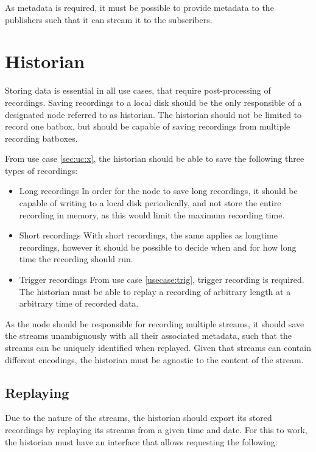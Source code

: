 
As metadata is required, it must be possible to provide metadata to the publishers such that it can stream it to the subscribers. 


\section{Historian}

Storing data is essential in all use cases, that require post-processing of recordings. Saving recordings to a local disk should be the only responsible of a designated node referred to as historian.
The historian should not be limited to record one batbox, but should be capable of saving recordings from multiple recording batboxes.

From use case \ref{sec:uc:x}, the historian should be able to save the following three types of recordings:
\begin{itemize}
	\item Long recordings
		In order for the node to save long recordings, it should be capable of writing to a local disk periodically, and not store the entire recording in memory, as this would limit the maximum recording time.

	\item Short recordings
		With short recordings, the same applies as longtime recordings, however it should be possible to decide when and for how long time the recording should run.
	\item Trigger recordings
		From use case \ref{usecase:trig}, trigger recording is required. The historian must be able to replay a recording of arbitrary length at a arbitrary time of recorded data.
\end{itemize}

As the node should be responsible for recording multiple streams, it should save the streams unambiguously with all their associated metadata, such that the streams can be uniquely identified when replayed.
Given that streams can contain different encodings, the historian must be agnostic to the content of the stream.



\subsection{Replaying}
Due to the nature of the streams, the historian should export its stored recordings by replaying its streams from a given time and date. For this to work, the historian must have an interface that allows requesting the following:

